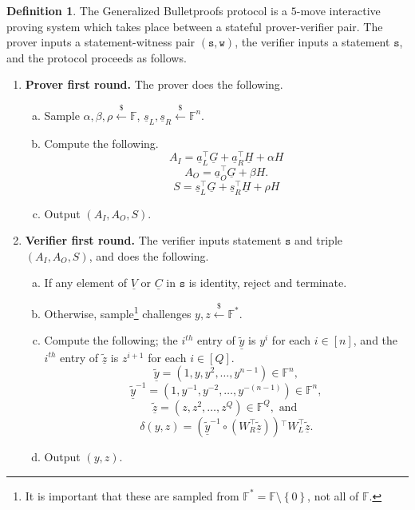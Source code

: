 \documentclass{article}
\theoremstyle{definition}
\newtheorem{definition}[theorem]{Definition}
\newcommand{\samp}{\mathrel{\overset{\$}{\leftarrow}}}
\newcommand{\FF}{\mathbb{F}}
\newcommand{\zq}{\widetilde{\underline{z}}}
\newcommand{\yq}{\widetilde{\underline{y}}}
\begin{document}
\begin{definition}
The Generalized Bulletproofs protocol is a $5$-move interactive proving system which takes place between a stateful prover-verifier pair. The prover inputs a statement-witness pair $(\texttt{s}, \texttt{w})$, the verifier inputs a statement $\texttt{s}$, and the protocol proceeds as follows.
\begin{enumerate}
\item \textbf{Prover first round.} The prover does the following.
\begin{enumerate}[(a)]
	\item Sample $\alpha, \beta, \rho \samp \FF$, $\underline{s}_L, \underline{s}_R \samp \FF^n$.
	\item Compute the following.
	$$A_I = \underline{a}_L^\top \underline{G} + \underline{a}_R^\top \underline{H} + \alpha H$$
	$$A_O = \underline{a}_O^\top \underline{G} + \beta H.$$
	$$S = \underline{s}_L^\top \underline{G} + \underline{s}_R^\top \underline{H} + \rho H$$
	\item Output $(A_I, A_O, S)$.
\end{enumerate}

\item \textbf{Verifier first round.} The verifier inputs statement $\texttt{s}$ and triple $(A_I, A_O, S)$, and does the following.
\begin{enumerate}[(a)]
\item If any element of $\underline{V}$ or $\underline{C}$ in $\texttt{s}$ is identity, reject and terminate.
\item Otherwise, sample\footnote{It is important that these are sampled from $\FF^* = \FF \setminus \left\{0\right\}$, not all of $\FF$.} challenges $y, z \samp \FF^*$.
\item \label{sharedstep} Compute the following; the $i^{th}$ entry of $\yq$ is $y^i$ for each $i \in [n]$, and the $i^{th}$ entry of $\zq$ is $z^{i+1}$ for each $i \in [Q]$.
	$$\yq = \left( 1, y, y^2, \ldots, y^{n-1} \right) \in \FF^n,$$
    $$\yq^{-1} = \left( 1, y^{-1}, y^{-2}, \ldots, y^{-(n-1)} \right) \in \FF^n,$$
	$$\zq = \left( z, z^2, \ldots, z^Q \right) \in \FF^Q,\text{ and }$$
    $$\delta(y, z) = \left(\yq^{-1} \circ \left(W_R^\top \zq\right)\right)\!^\top W_L^\top \zq.$$
\item Output $(y, z)$.
\end{enumerate}


\end{enumerate}
\end{definition}
\end{document}
